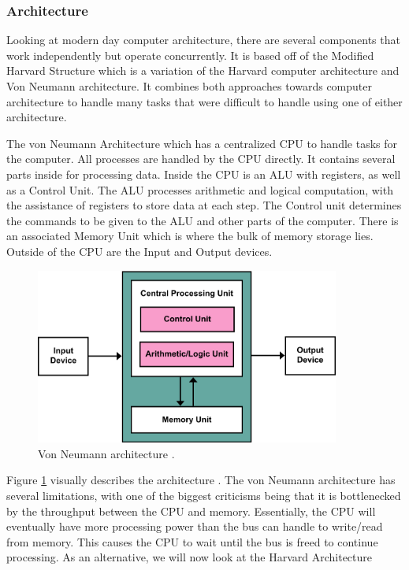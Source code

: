 \subsubsection{Architecture}\label{subsubsec:Arch}

Looking at modern day computer architecture, there are several components that work independently but operate concurrently.
It is based off of the Modified Harvard Structure which is a variation of the Harvard computer architecture and Von Neumann architecture.
It combines both approaches towards computer architecture to handle many tasks that were difficult to handle using one of either architecture.

The von Neumann Architecture which has a centralized CPU to handle tasks for the computer.
All processes are handled by the CPU directly.
It contains several parts inside for processing data.
Inside the CPU is an ALU with registers, as well as a Control Unit.
The ALU processes arithmetic and logical computation, with the assistance of registers to store data at each step.
The Control unit determines the commands to be given to the ALU and other parts of the computer.
There is an associated Memory Unit which is where the bulk of memory storage lies.
Outside of the CPU are the Input and Output devices.

\begin{figure}[htb]
    \centering
    \includegraphics[width=10cm]{Images/Von_Neumann_Architecture.png}
       \caption{Von Neumann architecture \cite{vonNeumannImg}.}
           \label{fig:VonNeumannArch}
\end{figure}

Figure \ref{fig:VonNeumannArch} visually describes the architecture \cite{vonNeumannImg}.
The von Neumann architecture has several limitations, with one of the biggest criticisms being that it is bottlenecked by the throughput between the CPU and memory.
Essentially, the CPU will eventually have more processing power than the bus can handle to write/read from memory.
This causes the CPU to wait until the bus is freed to continue processing.
As an alternative, we will now look at the Harvard Architecture

